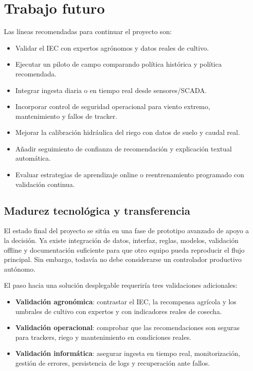 ﻿\documentclass[11pt,a4paper]{article}
\begin{document}
\section{Trabajo futuro}

Las líneas recomendadas para continuar el proyecto son:

\begin{itemize}
    \item Validar el IEC con expertos agrónomos y datos reales de cultivo.
    \item Ejecutar un piloto de campo comparando política histórica y política recomendada.
    \item Integrar ingesta diaria o en tiempo real desde sensores/SCADA.
    \item Incorporar control de seguridad operacional para viento extremo, mantenimiento y fallos de tracker.
    \item Mejorar la calibración hidráulica del riego con datos de suelo y caudal real.
    \item Añadir seguimiento de confianza de recomendación y explicación textual automática.
    \item Evaluar estrategias de aprendizaje online o reentrenamiento programado con validación continua.
\end{itemize}

\subsection{Madurez tecnológica y transferencia}

El estado final del proyecto se sitúa en una fase de prototipo avanzado de apoyo a la decisión. Ya existe integración de datos, interfaz, reglas, modelos, validación offline y documentación suficiente para que otro equipo pueda reproducir el flujo principal. Sin embargo, todavía no debe considerarse un controlador productivo autónomo.

El paso hacia una solución desplegable requeriría tres validaciones adicionales:

\begin{itemize}
    \item \textbf{Validación agronómica}: contrastar el IEC, la recompensa agrícola y los umbrales de cultivo con expertos y con indicadores reales de cosecha.
    \item \textbf{Validación operacional}: comprobar que las recomendaciones son seguras para trackers, riego y mantenimiento en condiciones reales.
    \item \textbf{Validación informática}: asegurar ingesta en tiempo real, monitorización, gestión de errores, persistencia de logs y recuperación ante fallos.
\end{itemize}
\end{document}
